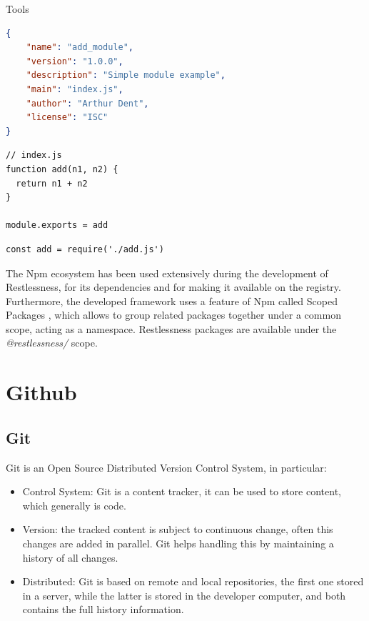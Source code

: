 \begin{chapter}{Tools}
    \bigskip
    \begin{lstlisting}[caption=A simple \textit{package.json}, label={lst:add_module},language=json]
{
    "name": "add_module",
    "version": "1.0.0",
    "description": "Simple module example",
    "main": "index.js",
    "author": "Arthur Dent",
    "license": "ISC"
}
    \end{lstlisting}

    \bigskip
    \begin{lstlisting}[caption=CommonJs module definition, label={lst:add_fn}]
// index.js
function add(n1, n2) {
  return n1 + n2
}

module.exports = add
    \end{lstlisting}

    \bigskip
    \begin{lstlisting}[caption=CommonJs module usage, label={lst:add_require}]
const add = require('./add.js')
    \end{lstlisting}

    The Npm ecosystem has been used extensively during the development of Restlessness,
    for its dependencies and for making it available on the registry.
    Furthermore, the developed framework uses a feature of Npm called Scoped Packages
    \cite{npm_scoped_packages}, which allows to group related packages together
    under a common scope, acting as a namespace. Restlessness packages are available
    under the \textit{@restlessness/} scope.

    \section{Github}
    \subsection{Git}
    Git is an Open Source Distributed Version Control System, in particular:
    \begin{itemize}
        \item Control System: Git is a content tracker, it can be used to store
            content, which generally is code.
        \item Version: the tracked content is subject to continuous change, often
            this changes are added in parallel. Git helps handling this by maintaining
            a history of all changes.
        \item Distributed: Git is based on remote and local repositories, the first
            one stored in a server, while the latter is stored in the developer
            computer, and both contains the full history information.
    \end{itemize}


\end{chapter}
